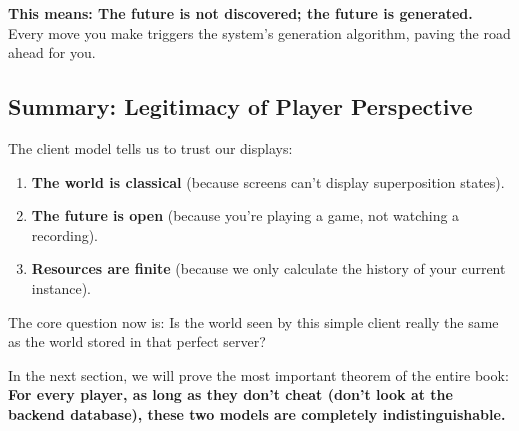 \textbf{This means: The future is not discovered; the future is generated.} Every move you make triggers the system's generation algorithm, paving the road ahead for you.

\subsection{Summary: Legitimacy of Player Perspective}

The client model tells us to trust our displays:
\begin{enumerate}
\item \textbf{The world is classical} (because screens can't display superposition states).
\item \textbf{The future is open} (because you're playing a game, not watching a recording).
\item \textbf{Resources are finite} (because we only calculate the history of your current instance).
\end{enumerate}

The core question now is: Is the world seen by this simple client really the same as the world stored in that perfect server?

In the next section, we will prove the most important theorem of the entire book: \textbf{For every player, as long as they don't cheat (don't look at the backend database), these two models are completely indistinguishable.}
